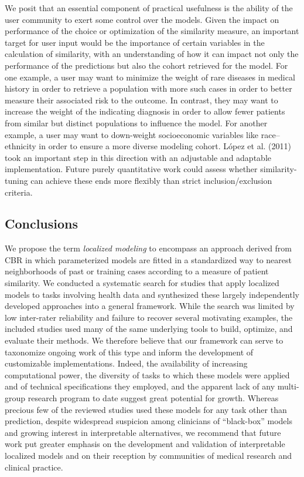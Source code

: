 \documentclass{article}
\begin{document}
We posit that an essential component of practical usefulness is the
ability of the user community to exert some control over the models.
Given the impact on performance of the choice or optimization of the
similarity measure, an important target for user input would be the
importance of certain variables in the calculation of similarity, with
an understanding of how it can impact not only the performance of the
predictions but also the cohort retrieved for the model. For one
example, a user may want to minimize the weight of rare diseases in
medical history in order to retrieve a population with more such cases
in order to better measure their associated risk to the outcome. In
contrast, they may want to increase the weight of the indicating
diagnosis in order to allow fewer patients from similar but distinct
populations to influence the model. For another example, a user may want
to down-weight socioeconomic variables like race--ethnicity in order to
ensure a more diverse modeling cohort. López et al. (2011) took an
important step in this direction with an adjustable and adaptable
implementation. Future purely quantitative work could assess whether
similarity-tuning can achieve these ends more flexibly than strict
inclusion/exclusion criteria.

\hypertarget{conclusions}{%
\subsection{Conclusions}\label{conclusions}}

We propose the term \emph{localized modeling} to encompass an approach
derived from CBR in which parameterized models are fitted in a
standardized way to nearest neighborhoods of past or training cases
according to a measure of patient similarity. We conducted a systematic
search for studies that apply localized models to tasks involving health
data and synthesized these largely independently developed approaches
into a general framework. While the search was limited by low
inter-rater reliability and failure to recover several motivating
examples, the included studies used many of the same underlying tools to
build, optimize, and evaluate their methods. We therefore believe that
our framework can serve to taxonomize ongoing work of this type and
inform the development of customizable implementations. Indeed, the
availability of increasing computational power, the diversity of tasks
to which these models were applied and of technical specifications they
employed, and the apparent lack of any multi-group research program to
date suggest great potential for growth. Whereas precious few of the
reviewed studies used these models for any task other than prediction,
despite widespread suspicion among clinicians of ``black-box'' models
and growing interest in interpretable alternatives, we recommend that
future work put greater emphasis on the development and validation of
interpretable localized models and on their reception by communities of
medical research and clinical practice.
\end{document}
